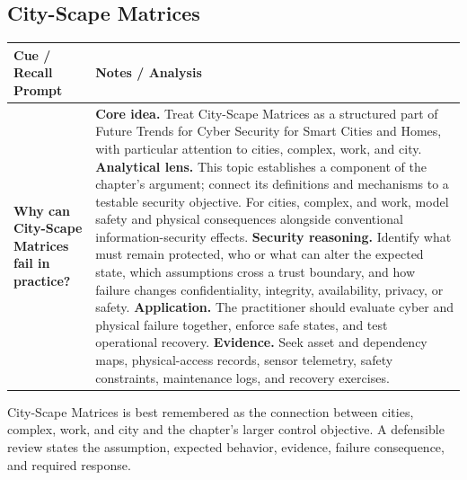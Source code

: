 \documentclass[11pt]{article}
\newcommand{\CornellHeader}{%
\rowcolor{Navy}\color{white}\bfseries Cue / Recall Prompt & \color{white}\bfseries Notes / Analysis\\\hline}
\newcommand{\CornellRow}[2]{%
\cellcolor{CueGray}\RaggedRight\textbf{#1} & \RaggedRight #2\\\hline}
\begin{document}
\subsection*{City-Scape Matrices}
\begin{longtable}{>{\RaggedRight\arraybackslash}p{}|>{\RaggedRight\arraybackslash}p{}}
\CornellHeader
\CornellRow{Why can City-Scape Matrices fail in practice?}{\textbf{Core idea.} Treat City-Scape Matrices as a structured part of Future Trends for Cyber Security for Smart Cities and Homes, with particular attention to cities, complex, work, and city. \textbf{Analytical lens.} This topic establishes a component of the chapter's argument; connect its definitions and mechanisms to a testable security objective. For cities, complex, and work, model safety and physical consequences alongside conventional information-security effects. \textbf{Security reasoning.} Identify what must remain protected, who or what can alter the expected state, which assumptions cross a trust boundary, and how failure changes confidentiality, integrity, availability, privacy, or safety. \textbf{Application.} The practitioner should evaluate cyber and physical failure together, enforce safe states, and test operational recovery. \textbf{Evidence.} Seek asset and dependency maps, physical-access records, sensor telemetry, safety constraints, maintenance logs, and recovery exercises.}
\end{longtable}
\begin{topicsummary}
City-Scape Matrices is best remembered as the connection between cities, complex, work, and city and the chapter's larger control objective. A defensible review states the assumption, expected behavior, evidence, failure consequence, and required response.
\end{topicsummary}
\end{document}
